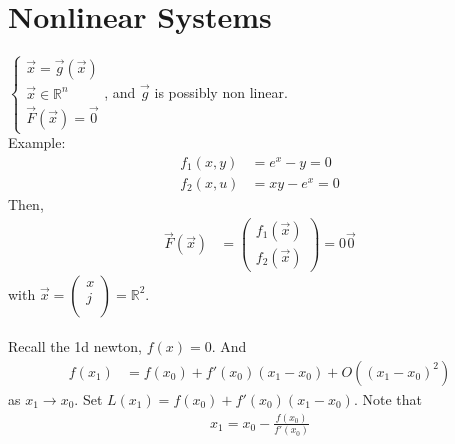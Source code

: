 \documentclass[11pt,oneside]{book}
\theoremstyle{break}
\theoremstyle{break}
\newcommand{\R}{\mathbb{R}}
\newcommand{\example}{\color{purple}Example: \color{black}}
\begin{document}
\chapter[Nonlinear Systems]{Nonlinear Systems}
$\begin{cases}
\vec{x}=\vec{g}(\vec{x})\\
\vec{x}\in \R^n\\
\vec{F}(\vec{x})=\vec{0}
\end{cases}$, and $\vec{g}$ is possibly non linear. \\
\example \begin{align*}
f_1(x,y)&=e^x-y=0\\
f_2(x,u)&=xy-e^x=0
\end{align*}
Then, \begin{align*}
\vec{F}(\vec{x})&=\begin{pmatrix}
f_1(\vec{x})\\
f_2(\vec{x})
\end{pmatrix}=0\vec{0}
\end{align*}
with $\vec{x}=\begin{pmatrix}
x\\
j\\
\end{pmatrix}=\R^2$.\\
\hfill\\
Recall the 1d newton, $f(x)=0$. And \begin{align*}
f(x_1)&=f(x_0)+f'(x_0)(x_1-x_0)+O((x_1-x_0)^2)
\end{align*}
as $x_1\to x_0$. Set $L(x_1)=f(x_0)+f'(x_0)(x_1-x_0).$ Note that \begin{align*}
x_1=x_0-\frac{f(x_0)}{f'(x_0)}
\end{align*}
\end{document}
